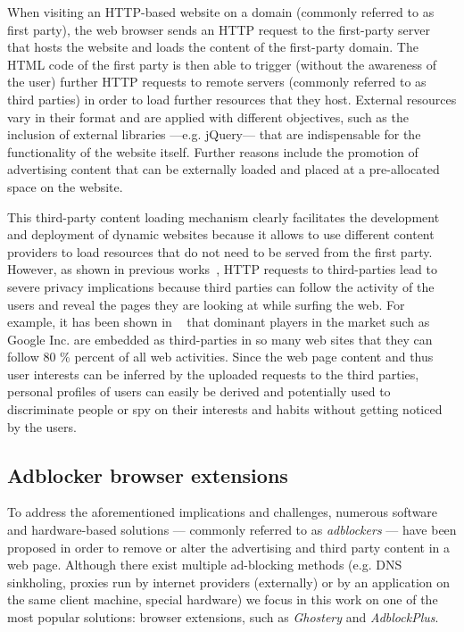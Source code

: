 \documentclass[compsoc, conference, letterpaper, 10pt, times]{IEEEtran}
\begin{document}
When visiting an HTTP-based website on a domain (commonly referred to as first party), the web browser sends an HTTP request to the first-party server that hosts the website and loads the content of the first-party domain. The HTML code of the first party is then able to trigger (without the awareness of the user) further HTTP requests to remote servers (commonly referred to as third parties) in order to load further resources that they host. External resources vary in their format and are applied with different objectives, such as the inclusion of external libraries ---e.g. jQuery--- that are indispensable for the functionality of the website itself. Further reasons include the promotion of advertising content that can be externally loaded and placed at a pre-allocated space on the website.

This third-party content loading mechanism clearly facilitates the development and deployment of dynamic websites because it allows to use different content providers to load resources that do not need to be served from the first party. However, as shown in previous works~\cite{mayer,barford, krishnamurthy_privacy_diffusion, soltani}, HTTP requests to third-parties lead to severe privacy implications because third parties can follow the activity of the users and reveal the pages they are looking at while surfing the web. For example, it has been shown in ~\cite{Gill13} that dominant players in the market such as Google Inc. are embedded as third-parties in so many web sites that they can follow 80 \% percent of all web activities. Since the web page content and thus user interests can be inferred by the uploaded requests to the third parties, personal profiles of users can easily be derived and potentially used to discriminate people or spy on their interests and habits without getting noticed by the users.

\subsection{Adblocker browser extensions}



To address the aforementioned implications and challenges, numerous software and hardware-based solutions --- commonly referred to as \textit{adblockers} --- have been proposed in order to remove or alter the advertising and third party content in a web page. Although there exist multiple ad-blocking methods (e.g. DNS sinkholing, proxies run by internet providers (externally) or by an application on the same client machine, special hardware) we focus in this work on one of the most popular solutions: browser extensions, such as \textit{Ghostery} and \textit{AdblockPlus}.
\end{document}
